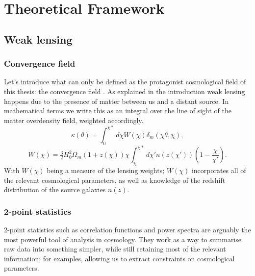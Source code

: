 \chapter{Theoretical Framework}
\section{Weak lensing}
\label{sec:weak lensing}
\subsection{Convergence field}
Let's introduce what can only be defined as the protagonist cosmological field of this thesis: the convergence field \cite{dodelson} \cite{weaklensing} \cite{cosmology:lensing} \cite{cosmology:lensing2}.
As explained in the introduction weak lensing happens due to the presence of matter between us and a distant source. In mathematical terms we write this as an integral over the line of sight of the matter overdensity field, weighted accordingly.
\begin{equation}
    \kappa(\theta) = \int_0^{\chi*}d\chi W(\chi)\delta_m(\chi \theta, \chi),
\end{equation}
\begin{equation}
    W(\chi)=\tfrac{3}{2}H_0^2\Omega_m(1+z(\chi))\chi \int_\chi^{\chi*}d\chi' n(z(\chi'))\left(1-\frac{\chi}{\chi'}\right).
    \label{eq:lensing weight}
\end{equation}
With $W(\chi)$ being a measure of the lensing weights; $W(\chi)$ incorporates all of the relevant cosmological parameters, as well as knowledge of the redshift distribution of the source galaxies $n(z)$.

\subsection{2-point statistics}
2-point statistics such as correlation functions and power spectra are arguably the most powerful tool of analysis in cosmology. They work as a way to summarise raw data into something simpler, while still retaining most of the relevant information; for examples, allowing us to extract constraints on cosmological parameters.

